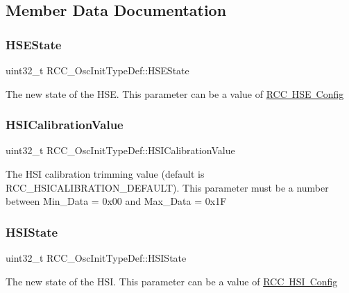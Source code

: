 \subsection{Member Data Documentation}
\mbox{\label{struct_r_c_c___osc_init_type_def_a7e05d6eec98ed8cdaba00ca3d167ff72}} 
\subsubsection{\texorpdfstring{HSEState}{HSEState}}
{\footnotesize\ttfamily uint32\+\_\+t R\+C\+C\+\_\+\+Osc\+Init\+Type\+Def\+::\+H\+S\+E\+State}

The new state of the H\+SE. This parameter can be a value of \mbox{\hyperlink{group___r_c_c___h_s_e___config}{R\+CC H\+SE Config}} \mbox{\label{struct_r_c_c___osc_init_type_def_a9b2e48e452d0c334f2b9473216064560}} 
\subsubsection{\texorpdfstring{HSICalibrationValue}{HSICalibrationValue}}
{\footnotesize\ttfamily uint32\+\_\+t R\+C\+C\+\_\+\+Osc\+Init\+Type\+Def\+::\+H\+S\+I\+Calibration\+Value}

The H\+SI calibration trimming value (default is R\+C\+C\+\_\+\+H\+S\+I\+C\+A\+L\+I\+B\+R\+A\+T\+I\+O\+N\+\_\+\+D\+E\+F\+A\+U\+LT). This parameter must be a number between Min\+\_\+\+Data = 0x00 and Max\+\_\+\+Data = 0x1F \mbox{\label{struct_r_c_c___osc_init_type_def_a39b62cae65fe7a251000354e5bba8cb6}} 
\subsubsection{\texorpdfstring{HSIState}{HSIState}}
{\footnotesize\ttfamily uint32\+\_\+t R\+C\+C\+\_\+\+Osc\+Init\+Type\+Def\+::\+H\+S\+I\+State}

The new state of the H\+SI. This parameter can be a value of \mbox{\hyperlink{group___r_c_c___h_s_i___config}{R\+CC H\+SI Config}} \mbox{\label{struct_r_c_c___osc_init_type_def_a7c1294e9407e69e80fe034caf35fe7ea}} 
